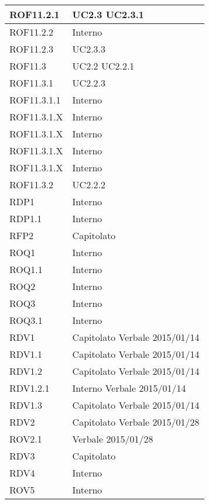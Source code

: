\begin{center}
\begin{longtable}{| p{4cm} | p{4cm} |}
\hline
ROF11.2.1   &  UC2.3 \newline UC2.3.1 \\
\hline
ROF11.2.2   &  Interno \\
\hline
ROF11.2.3   &  UC2.3.3 \\
\hline
ROF11.3   &  UC2.2 \newline UC2.2.1 \\
\hline
ROF11.3.1   &  UC2.2.3 \\
\hline
ROF11.3.1.1   &  Interno \\
\hline
ROF11.3.1.X   &  Interno \\
\hline
ROF11.3.1.X   &  Interno \\
\hline
ROF11.3.1.X   &  Interno \\
\hline
ROF11.3.1.X   &  Interno \\
\hline
ROF11.3.2   &  UC2.2.2 \\
\hline
RDP1   &  Interno \\
\hline
RDP1.1   &  Interno \\
\hline
RFP2   &  Capitolato \\
\hline
ROQ1   &  Interno \\
\hline
ROQ1.1   &  Interno \\
\hline
ROQ2   &  Interno \\
\hline
ROQ3   &  Interno \\
\hline
ROQ3.1   &  Interno \\
\hline
RDV1   &  Capitolato \newline Verbale 2015/01/14 \\
\hline
RDV1.1   &  Capitolato \newline Verbale 2015/01/14 \\
\hline
RDV1.2   &  Capitolato \newline Verbale 2015/01/14 \\
\hline
RDV1.2.1   &  Interno \newline Verbale 2015/01/14 \\
\hline
RDV1.3   &  Capitolato \newline Verbale 2015/01/14 \\
\hline
RDV2   &  Capitolato \newline Verbale 2015/01/28 \\
\hline
ROV2.1   &  Verbale 2015/01/28 \\
\hline
RDV3   &  Capitolato \\
\hline
RDV4   &  Interno \\
\hline
ROV5   &  Interno \\

\end{longtable}
\end{center}
